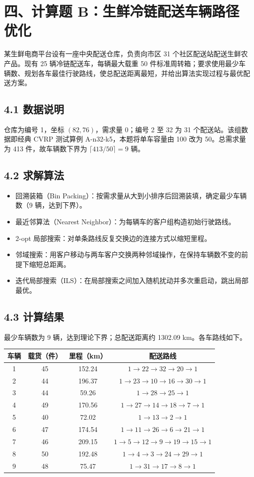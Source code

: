 \documentclass[12pt,a4paper]{ctexart}
\begin{document}
\section{四、计算题 B：生鲜冷链配送车辆路径优化}

某生鲜电商平台设有一座中央配送仓库，负责向市区 31 个社区配送站配送生鲜农产品。现有 25 辆冷链配送车，每辆最大载重 50 件标准周转箱；要求使用最少车辆数、规划各车最佳行驶路线，使总配送距离最短，并给出算法实现过程与最优配送方案。

\subsection{4.1 数据说明}
仓库为编号 1，坐标 $(82,76)$，需求量 0；编号 2 至 32 为 31 个配送站。该组数据即经典 CVRP 测试算例 A-n32-k5，本题将单车容量由 100 改为 50。总需求量为 413 件，故车辆数下界为 $\lceil 413/50\rceil=9$ 辆。

\subsection{4.2 求解算法}
\begin{itemize}
  \item 回溯装箱（Bin Packing）：按需求量从大到小排序后回溯装填，确定最少车辆数（9 辆，达到下界）。
  \item 最近邻算法（Nearest Neighbor）：为每辆车的客户组构造初始行驶路线。
  \item 2-opt 局部搜索：对单条路线反复交换边的连接方式以缩短里程。
  \item 邻域搜索：用客户移动与两车客户交换两种邻域操作，在保持车辆数不变的前提下缩短总距离。
  \item 迭代局部搜索（ILS）：在局部搜索之间加入随机扰动并多次重启动，跳出局部最优。
\end{itemize}

\subsection{4.3 计算结果}
最少车辆数为 9 辆，达到理论下界；总配送距离约 1302.09 km。各车路线如下。

\begin{table}[H]
\centering
\begin{tabular}{cccc}
\toprule
车辆 & 载货（件） & 里程（km） & 配送路线 \\
\midrule
1 & 45 & 152.24 & $1\to22\to32\to20\to1$ \\
2 & 44 & 196.37 & $1\to23\to10\to16\to30\to1$ \\
3 & 44 & 59.26 & $1\to28\to25\to1$ \\
4 & 49 & 170.56 & $1\to27\to14\to18\to7\to1$ \\
5 & 40 & 72.02 & $1\to13\to2\to1$ \\
6 & 47 & 174.54 & $1\to11\to26\to6\to21\to1$ \\
7 & 46 & 209.15 & $1\to5\to12\to9\to19\to15\to1$ \\
8 & 50 & 192.48 & $1\to4\to3\to24\to29\to1$ \\
9 & 48 & 75.47 & $1\to31\to17\to8\to1$ \\
\bottomrule
\end{tabular}
\end{table}
\end{document}

